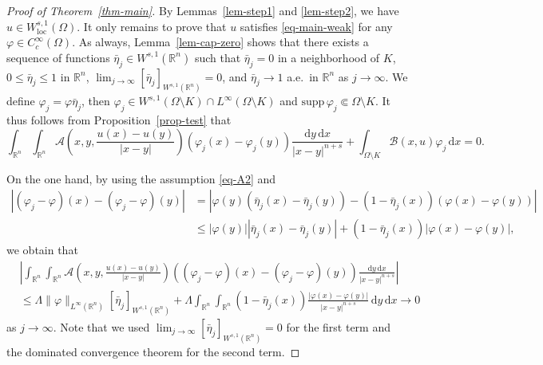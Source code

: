 \documentclass{amsart}
\theoremstyle{plain}
\theoremstyle{definition}
\numberwithin{equation}{section}
\begin{document}
\begin{proof}[Proof of Theorem~\ref{thm-main}]
By Lemmas~\ref{lem-step1} and \ref{lem-step2}, we have $u \in W^{s, 1}_{\mathrm{loc}}(\Omega)$. It only remains to prove that $u$ satisfies \eqref{eq-main-weak} for any $\varphi \in C^\infty_c(\Omega)$. As always, Lemma~\ref{lem-cap-zero} shows that there exists a sequence of functions $\bar{\eta}_j \in W^{s, 1}(\mathbb{R}^n)$ such that $\bar{\eta}_j=0$ in a neighborhood of $K$, $0 \leq \bar{\eta}_j \leq 1$ in $\mathbb{R}^n$, $\lim_{j\to \infty} [\bar{\eta}_j]_{W^{s, 1}(\mathbb{R}^n)} = 0$, and $\bar{\eta}_j \to 1$ a.e.\ in $\mathbb{R}^n$ as $j \to \infty$. We define $\varphi_j=\varphi \bar{\eta}_j$, then $\varphi_j \in W^{s, 1}(\Omega \setminus K) \cap L^\infty(\Omega \setminus K)$ and $\mathrm{supp}\,\varphi_j \Subset \Omega \setminus K$. It thus follows from Proposition~\ref{prop-test} that
\begin{equation}\label{eq-weak-j}
\int_{\mathbb{R}^n} \int_{\mathbb{R}^n} \mathscr{A} \left( x, y, \frac{u(x)-u(y)}{|x-y|} \right) (\varphi_j(x)-\varphi_j(y)) \frac{\mathrm{d}y \,\mathrm{d}x}{|x-y|^{n+s}} + \int_{\Omega \setminus K} \mathscr{B}(x, u) \varphi_j \,\mathrm{d}x = 0.
\end{equation}

On the one hand, by using the assumption \eqref{eq-A2} and
\begin{align*}
|(\varphi_j-\varphi)(x) - (\varphi_j-\varphi)(y)|
&=|\varphi(y)(\bar{\eta}_j(x)-\bar{\eta}_j(y))-(1-\bar{\eta}_j(x))(\varphi(x)-\varphi(y))| \\
&\leq |\varphi(y)| |\bar{\eta}_j(x)-\bar{\eta}_j(y)| + (1-\bar{\eta}_j(x)) |\varphi(x)-\varphi(y)|,
\end{align*}
we obtain that
\begin{align*}
&\left| \int_{\mathbb{R}^n} \int_{\mathbb{R}^n} \mathscr{A} \left( x, y, \frac{u(x)-u(y)}{|x-y|} \right) ((\varphi_j-\varphi)(x)-(\varphi_j-\varphi)(y)) \frac{\mathrm{d}y \,\mathrm{d}x}{|x-y|^{n+s}} \right| \\
&\leq \Lambda \|\varphi\|_{L^\infty(\mathbb{R}^n)} [\bar{\eta}_j]_{W^{s, 1}(\mathbb{R}^n)} + \Lambda \int_{\mathbb{R}^n} \int_{\mathbb{R}^n} (1-\bar{\eta}_j(x)) \frac{|\varphi(x)-\varphi(y)|}{|x-y|^{n+s}} \,\mathrm{d}y \,\mathrm{d}x \to 0
\end{align*}
as $j \to \infty$. Note that we used $\lim_{j\to \infty} [\bar{\eta}_j]_{W^{s, 1}(\mathbb{R}^n)} = 0$ for the first term and the dominated convergence theorem for the second term.


\end{proof}
\end{document}
